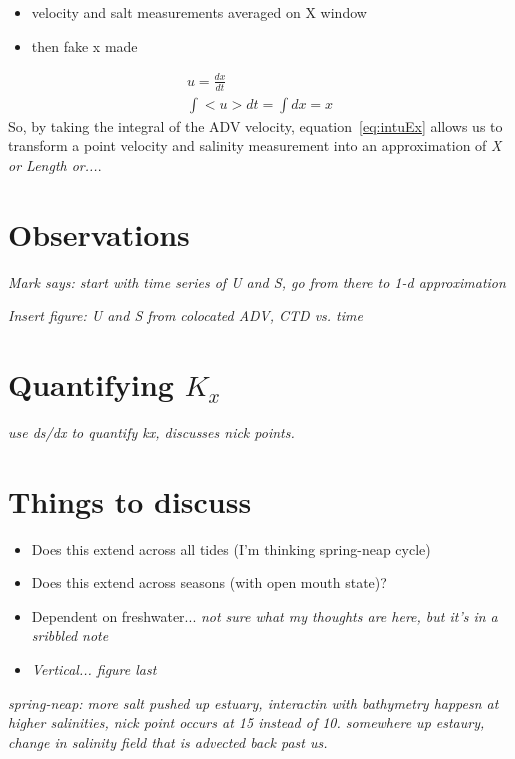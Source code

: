 \begin{itemize} \item{velocity and salt measurements averaged on X window} \item{then fake x made} \end{itemize}

\begin{eqnarray}
u = \frac{dx}{dt} \label{eq:uEdxdt}\\
\int{<u>dt} = \int{dx} = x \label{eq:intuEx}
\end{eqnarray}
So, by taking the integral of the ADV velocity, equation~\ref{eq:intuEx} allows us to transform a point velocity and salinity measurement into an approximation of \emph{X or Length or...}. 






\section{Observations}
\emph{Mark says: start with time series of U and S, go from there to 1-d approximation}

\emph{Insert figure: U and S from colocated ADV, CTD vs. time}



\section{Quantifying $K_x$}
\emph{use ds/dx to quantify kx, discusses nick points.}
\section{Things to discuss}
\begin{itemize}
	\item Does this extend across all tides (I'm thinking spring-neap cycle)
	\item Does this extend across seasons (with open mouth state)?
	\item Dependent on freshwater... \emph{not sure what my thoughts are here, but it's in a sribbled note}
	\item \emph{Vertical... figure last}
\end{itemize}



\emph{spring-neap:
more salt pushed up estuary, interactin with bathymetry happesn at higher salinities, nick point occurs at 15 instead of 10. somewhere up estaury, change in salinity field that is advected back past us. }

